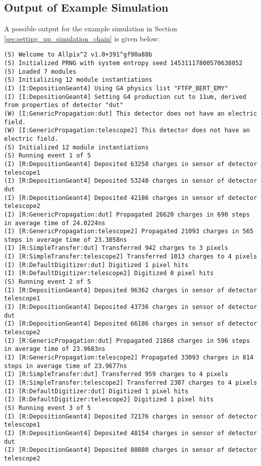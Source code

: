 \subsection{Output of Example Simulation}
\label{sec:example_output}
A possible output for the example simulation in Section \ref{sec:setting_up_simulation_chain} is given below:

\begin{lstlisting}[breaklines]
(S) Welcome to Allpix^2 v1.0+391^gf90a88b
(S) Initialized PRNG with system entropy seed 14531117800570638852
(S) Loaded 7 modules
(S) Initializing 12 module instantiations
(I) [I:DepositionGeant4] Using G4 physics list "FTFP_BERT_EMY"
(I) [I:DepositionGeant4] Setting G4 production cut to 11um, derived from properties of detector "dut"
(W) [I:GenericPropagation:dut] This detector does not have an electric field.
(W) [I:GenericPropagation:telescope2] This detector does not have an electric field.
(S) Initialized 12 module instantiations
(S) Running event 1 of 5
(I) [R:DepositionGeant4] Deposited 63258 charges in sensor of detector telescope1
(I) [R:DepositionGeant4] Deposited 53240 charges in sensor of detector dut
(I) [R:DepositionGeant4] Deposited 42186 charges in sensor of detector telescope2
(I) [R:GenericPropagation:dut] Propagated 26620 charges in 690 steps in average time of 24.0224ns
(I) [R:GenericPropagation:telescope2] Propagated 21093 charges in 565 steps in average time of 23.3058ns
(I) [R:SimpleTransfer:dut] Transferred 942 charges to 3 pixels
(I) [R:SimpleTransfer:telescope2] Transferred 1013 charges to 4 pixels
(I) [R:DefaultDigitizer:dut] Digitized 1 pixel hits
(I) [R:DefaultDigitizer:telescope2] Digitized 0 pixel hits
(S) Running event 2 of 5
(I) [R:DepositionGeant4] Deposited 96362 charges in sensor of detector telescope1
(I) [R:DepositionGeant4] Deposited 43736 charges in sensor of detector dut
(I) [R:DepositionGeant4] Deposited 66186 charges in sensor of detector telescope2
(I) [R:GenericPropagation:dut] Propagated 21868 charges in 596 steps in average time of 23.9683ns
(I) [R:GenericPropagation:telescope2] Propagated 33093 charges in 814 steps in average time of 23.9677ns
(I) [R:SimpleTransfer:dut] Transferred 959 charges to 4 pixels
(I) [R:SimpleTransfer:telescope2] Transferred 2307 charges to 4 pixels
(I) [R:DefaultDigitizer:dut] Digitized 1 pixel hits
(I) [R:DefaultDigitizer:telescope2] Digitized 1 pixel hits
(S) Running event 3 of 5
(I) [R:DepositionGeant4] Deposited 72176 charges in sensor of detector telescope1
(I) [R:DepositionGeant4] Deposited 48154 charges in sensor of detector dut
(I) [R:DepositionGeant4] Deposited 80880 charges in sensor of detector telescope2

\end{lstlisting}
